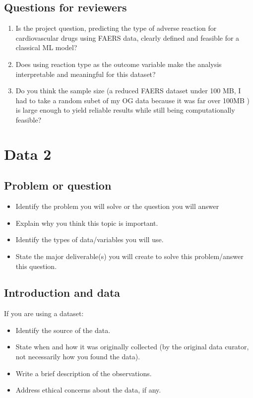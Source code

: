 \documentclass[
  letterpaper,
  DIV=11,
  numbers=noendperiod]{scrartcl}
\providecommand{\tightlist}{%
  \setlength{\itemsep}{0pt}\setlength{\parskip}{0pt}}
\begin{document}
\subsection{Questions for reviewers}\label{questions-for-reviewers}

\begin{enumerate}
\def\labelenumi{\arabic{enumi}.}
\tightlist
\item
  Is the project question, predicting the type of adverse reaction for
  cardiovascular drugs using FAERS data, clearly defined and feasible
  for a classical ML model?
\item
  Does using reaction type as the outcome variable make the analysis
  interpretable and meaningful for this dataset?
\item
  Do you think the sample size (a reduced FAERS dataset under 100 MB, I
  had to take a random subet of my OG data because it was far over 100MB
  ) is large enough to yield reliable results while still being
  computationally feasible?
\end{enumerate}

\section{Data 2}\label{data-2}

\subsection{Problem or question}\label{problem-or-question-1}

\begin{itemize}
\tightlist
\item
  Identify the problem you will solve or the question you will answer
\item
  Explain why you think this topic is important.
\item
  Identify the types of data/variables you will use.
\item
  State the major deliverable(s) you will create to solve this
  problem/answer this question.
\end{itemize}

\subsection{Introduction and data}\label{introduction-and-data-1}

If you are using a dataset:

\begin{itemize}
\item
  Identify the source of the data.
\item
  State when and how it was originally collected (by the original data
  curator, not necessarily how you found the data).
\item
  Write a brief description of the observations.
\item
  Address ethical concerns about the data, if any.
\end{itemize}
\end{document}
